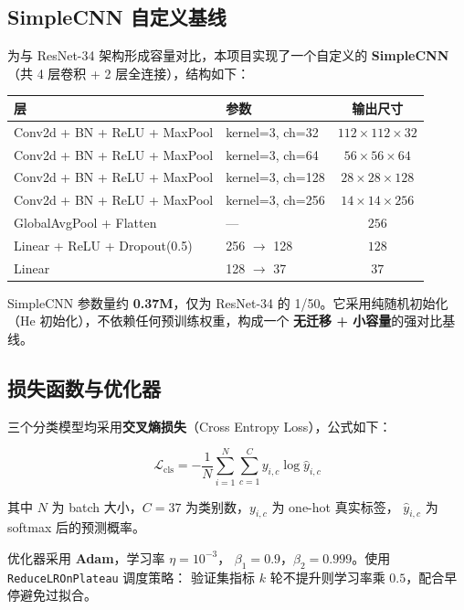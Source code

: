 \documentclass[12pt, a4paper, openany]{ctexbook}
\begin{document}
\subsection{SimpleCNN 自定义基线}

为与 ResNet-34 架构形成容量对比，本项目实现了一个自定义的
\textbf{SimpleCNN}（共 4 层卷积 + 2 层全连接），结构如下：

\begin{center}
\begin{tabular}{llc}
  \toprule
  \textbf{层} & \textbf{参数} & \textbf{输出尺寸} \\
  \midrule
  Conv2d + BN + ReLU + MaxPool & kernel=3, ch=32  & $112 \times 112 \times 32$ \\
  Conv2d + BN + ReLU + MaxPool & kernel=3, ch=64  & $56 \times 56 \times 64$ \\
  Conv2d + BN + ReLU + MaxPool & kernel=3, ch=128 & $28 \times 28 \times 128$ \\
  Conv2d + BN + ReLU + MaxPool & kernel=3, ch=256 & $14 \times 14 \times 256$ \\
  GlobalAvgPool + Flatten      & ---              & $256$ \\
  Linear + ReLU + Dropout(0.5) & 256 $\to$ 128    & $128$ \\
  Linear                       & 128 $\to$ 37     & $37$ \\
  \bottomrule
\end{tabular}
\end{center}

SimpleCNN 参数量约 \textbf{0.37M}，仅为 ResNet-34 的 1/50。它采用纯随机初始化
（He\cite{he2015kaiming} 初始化），不依赖任何预训练权重，构成一个
\textbf{无迁移 + 小容量}的强对比基线。

\subsection{损失函数与优化器}

三个分类模型均采用\textbf{交叉熵损失}（Cross Entropy Loss），公式如下：

\begin{equation}
  \mathcal{L}_{\text{cls}} = -\frac{1}{N}\sum_{i=1}^{N}\sum_{c=1}^{C}
    y_{i,c} \log \hat{y}_{i,c}
\end{equation}

其中 $N$ 为 batch 大小，$C = 37$ 为类别数，$y_{i,c}$ 为 one-hot 真实标签，
$\hat{y}_{i,c}$ 为 softmax 后的预测概率。

优化器采用 \textbf{Adam}\cite{kingma2014adam}，学习率 $\eta = 10^{-3}$，
$\beta_1 = 0.9$，$\beta_2 = 0.999$。使用 \texttt{ReduceLROnPlateau} 调度策略：
验证集指标 $k$ 轮不提升则学习率乘 $0.5$，配合早停避免过拟合。
\end{document}

